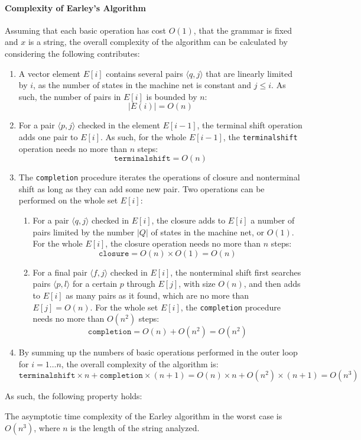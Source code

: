 \paragraph*{Complexity of Earley's Algorithm}
Assuming that each basic operation has cost $O(1)$, that the grammar is fixed and $x$ is a string, the overall complexity of the algorithm can be calculated by considering the following contributes:
\begin{enumerate}
    \item A vector element $E[i]$ contains several pairs $\langle q, j \rangle$ that are linearly limited by $i$, as the number of states in the machine net is constant and $j \leq i$. As such, the number of pairs in $E[i]$ is bounded by $n$: 
    \[ |E(i)| = O(n) \]
    \item For a pair $\langle p, j \rangle$ checked in the element $E[i-1]$, the terminal shift operation adds one pair to $E[i]$. As such, for the whole $E[i-1]$, the \texttt{terminalshift} operation needs no more than $n$ steps: 
    \[ \texttt{terminalshift} = O(n) \]
    \item The \texttt{completion} procedure iterates the operations of closure and nonterminal shift as long as they can add some new pair. Two operations can be performed on the whole set $E[i]$:
        \begin{enumerate}
            \item For a pair $\langle q, j\rangle$ checked in $E[i]$, the closure adds to $E[i]$ a number of pairs limited by the number $|Q|$ of states in the machine net, or $O(1)$. For the whole $E[i]$, the closure operation needs no more than $n$ steps: 
            \[ \texttt{closure} = O(n) \times O(1) = O(n) \]
            \item For a final pair $\langle f, j \rangle$ checked in $E[i]$, the nonterminal shift first searches pairs $\langle p, l\rangle$ for a certain $p$ through $E[j]$, with size $O(n)$, and then adds to $E[i]$ as many pairs as it found, which are no more than $E[j] = O(n)$. For the whole set $E[i]$, the \texttt{completion} procedure needs no more than $O(n^2)$ steps: 
            \[ \texttt{completion} = O(n) + O(n^2) = O(n^2) \]
        \end{enumerate}
    \item By summing up the numbers of basic operations performed in the outer loop for $i = 1 \dots n$, the overall complexity of the algorithm is: 
    \[ \texttt{terminalshift} \times n + \texttt{completion} \times (n+1) = O(n) \times n + O(n^2) \times (n + 1) = O(n^3) \]
\end{enumerate}
As such, the following property holds:
\begin{property}
    The asymptotic time complexity of the Earley algorithm in the worst case is $O(n^3)$, where $n$ is the length of the string analyzed.
\end{property}

